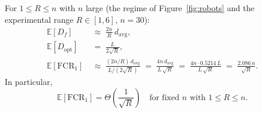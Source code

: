 \begin{theorem}\label{thm:m1-general}
For $1 \leq R \leq n$ with $n$ large (the regime of Figure~\ref{fig:robots}
and the experimental range $R \in [1,6]$, $n = 30$):
\begin{align}
  \mathbb{E}[D_f]
  &\;\approx\;
    \frac{2n}{R}\,d_{\mathrm{avg}},
  \label{eq:df-low-R}\\
  \mathbb{E}[D_{\mathrm{opt}}]
  &\;=\;
    \frac{L}{2\sqrt{R}},
  \label{eq:dopt-low-R}\\
  \mathbb{E}[\mathrm{FCR}_1]
  &\;\approx\;
    \frac{(2n/R)\,d_{\mathrm{avg}}}{L/(2\sqrt{R})}
    \;=\;
    \frac{4n\,d_{\mathrm{avg}}}{L\,\sqrt{R}}
    \;=\;
    \frac{4n \cdot 0.5214\,L}{L\,\sqrt{R}}
    \;=\;
    \frac{2.086\,n}{\sqrt{R}}.
    \label{eq:fcr1-low-R}
\end{align}
In particular,
\begin{equation}
  \mathbb{E}[\mathrm{FCR}_1] = \Theta\!\left(\frac{1}{\sqrt{R}}\right)
  \quad \text{for fixed } n \text{ with } 1 \leq R \leq n.
\end{equation}
\end{theorem}

